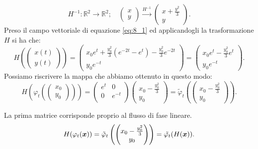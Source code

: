 \begin{exmp}
\[
    H^{-1}:\mathbb{R}^2\to \mathbb{R}^2; \quad  
    \begin{pmatrix} x \\ y \end{pmatrix} \xrightarrow{H^{-1}} \begin{pmatrix} x + \frac{y^2}{3} \\ y \end{pmatrix}
.\] 
Preso il campo vettoriale di equazione \ref{eq:8_1} ed applicandogli la trasformazione $H$ si ha che:
\[
    H\left(\begin{pmatrix} x(t)  \\ y(t)  \end{pmatrix}\right) = 
    \begin{pmatrix} x_0e^t + \frac{y_0^2}{3}(e^{-2t}-e^t) - \frac{y_0^2}{3}e^{-2t}  \\ y_0e^{-t} \end{pmatrix} =
    \begin{pmatrix} x_0e^t-\frac{y_0^2}{3}e^t \\ y_0e^{-t} \end{pmatrix}
.\] 
Possiamo riscrivere la mappa che abbiamo ottenuto in questo modo:
\[
    H\left(\varphi_t\left(\begin{pmatrix} x_0 \\ y_0 \end{pmatrix}\right) \right) =
\begin{pmatrix}
    e^t & 0 \\
    0 & e^{-t} \\
\end{pmatrix}
\begin{pmatrix} x_0-\frac{y_0^2}{3} \\ y_0 \end{pmatrix} = \tilde{\varphi}_t\left(\begin{pmatrix} x_0-\frac{y_0^2}{3} \\ y_0 \end{pmatrix}\right)
.\] 
\end{exmp}
\noindent
La prima matrice corrisponde proprio al flusso di fase lineare.
\[
    H(\varphi_t(\boldsymbol{x})) = \tilde{\varphi}_t \left(\begin{pmatrix} x_0-\frac{y_0^2}{3} \\ y_0 \end{pmatrix}\right) = 
    \tilde{\varphi_t}(H(\boldsymbol{x}))
.\] 
